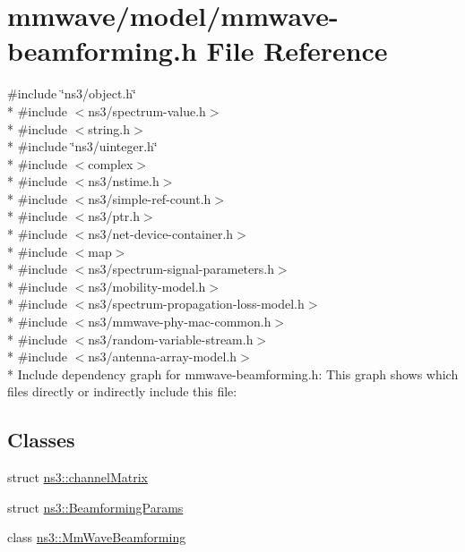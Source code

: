 \hypertarget{mmwave-beamforming_8h}{}\section{mmwave/model/mmwave-\/beamforming.h File Reference}
\label{mmwave-beamforming_8h}
{\ttfamily \#include \char`\"{}ns3/object.\+h\char`\"{}}\\*
{\ttfamily \#include $<$ns3/spectrum-\/value.\+h$>$}\\*
{\ttfamily \#include $<$string.\+h$>$}\\*
{\ttfamily \#include \char`\"{}ns3/uinteger.\+h\char`\"{}}\\*
{\ttfamily \#include $<$complex$>$}\\*
{\ttfamily \#include $<$ns3/nstime.\+h$>$}\\*
{\ttfamily \#include $<$ns3/simple-\/ref-\/count.\+h$>$}\\*
{\ttfamily \#include $<$ns3/ptr.\+h$>$}\\*
{\ttfamily \#include $<$ns3/net-\/device-\/container.\+h$>$}\\*
{\ttfamily \#include $<$map$>$}\\*
{\ttfamily \#include $<$ns3/spectrum-\/signal-\/parameters.\+h$>$}\\*
{\ttfamily \#include $<$ns3/mobility-\/model.\+h$>$}\\*
{\ttfamily \#include $<$ns3/spectrum-\/propagation-\/loss-\/model.\+h$>$}\\*
{\ttfamily \#include $<$ns3/mmwave-\/phy-\/mac-\/common.\+h$>$}\\*
{\ttfamily \#include $<$ns3/random-\/variable-\/stream.\+h$>$}\\*
{\ttfamily \#include $<$ns3/antenna-\/array-\/model.\+h$>$}\\*
Include dependency graph for mmwave-\/beamforming.h\+:
This graph shows which files directly or indirectly include this file\+:
\subsection*{Classes}
\begin{DoxyCompactItemize}
\item 
struct \hyperlink{structns3_1_1channelMatrix}{ns3\+::channel\+Matrix}
\item 
struct \hyperlink{structns3_1_1BeamformingParams}{ns3\+::\+Beamforming\+Params}
\item 
class \hyperlink{classns3_1_1MmWaveBeamforming}{ns3\+::\+Mm\+Wave\+Beamforming}
\end{DoxyCompactItemize}
